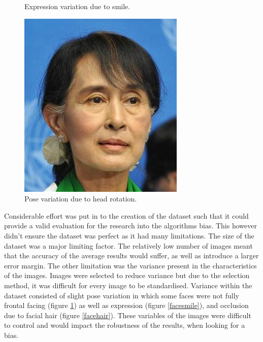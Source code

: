 \documentclass{l4proj}
\begin{document}
\begin{figure}[h!]
\begin{minipage}{0.32\textwidth}
    \caption{Expression variation due to smile.}
    \label{facesmile}
  \end{minipage} 
    \hfill
  \begin{minipage}{0.32\textwidth}
    \includegraphics[width=\textwidth]{images/28_f_m.jpg}
    \caption{Pose variation due to head rotation.}
    \label{facepose}
  \end{minipage}
    \hfill
\end{figure}

Considerable effort was put in to the creation of the dataset such that it could provide a valid evaluation for the research into the algorithms bias. This however didn't ensure the dataset was perfect as it had many limitations. The size of the dataset was a major limiting factor. The relatively low number of images meant that the accuracy of the average results would suffer, as well as introduce a larger error margin. The other limitation was the variance present in the characteristics of the images. Images were selected to reduce variance but due to the selection method, it was difficult for every image to be standardised. Variance within the dataset consisted of slight pose variation in which some faces were not fully frontal facing (figure \ref{facepose}) as well as expression (figure \ref{facesmile}), and occlusion due to facial hair (figure \ref{facehair}). These variables of the images were difficult to control and would impact the robustness of the results, when looking for a bias.
\end{document}
